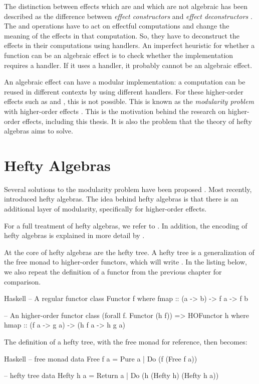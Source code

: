 The distinction between effects which are and which are not algebraic has been described as the difference between \emph{effect constructors} and \emph{effect deconstructors} \autocite{plotkin_algebraic_2003}. The  and  operations have to act on effectful computations and change the meaning of the effects in that computation. So, they have to deconstruct the effects in their computations using handlers. An imperfect heuristic for whether a function can be an algebraic effect is to check whether the implementation requires a handler. If it uses a handler, it probably cannot be an algebraic effect.

An algebraic effect can have a modular implementation: a computation can be reused in different contexts by using different handlers. For these higher-order effects such as  and , this is not possible. This is known as the \emph{modularity problem} with higher-order effects \autocite{wu_effect_2014}. This is the motivation behind the research on higher-order effects, including this thesis. It is also the problem that the theory of hefty algebras aims to solve.

\section{Hefty Algebras}\label{sec:hefty_algebras}

Several solutions to the modularity problem have been proposed \autocite{wu_effect_2014,oh_latent_2021}. Most recently, \textcite{bach_poulsen_hefty_2023} introduced hefty algebras. The idea behind hefty algebras is that there is an additional layer of modularity, specifically for higher-order effects.

For a full treatment of hefty algebras, we refer to \textcite{bach_poulsen_hefty_2023}. In addition, the encoding of hefty algebras is explained in more detail by \textcite{bach_poulsen_algebras_2023}.

At the core of hefty algebras are the hefty tree. A hefty tree is a generalization of the free monad to higher-order functors, which will write . In the listing below, we also repeat the definition of a functor from the previous chapter for comparison.
\begin{lst}{Haskell}
-- A regular functor
class Functor f where
  fmap :: (a -> b) -> f a -> f b

-- An higher-order functor
class (forall f. Functor (h f)) => HOFunctor h where
  hmap :: (f a -> g a) -> (h f a -> h g a)
\end{lst}
The definition of a hefty tree, with the free monad for reference, then becomes:
\begin{lst}{Haskell}
-- free monad
data Free f a
  = Pure a
  | Do (f (Free f a))

-- hefty tree
data Hefty h a
  = Return a
  | Do (h (Hefty h) (Hefty h a))
\end{lst}

